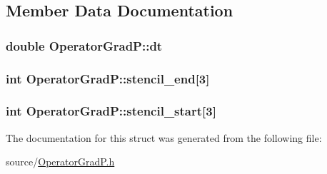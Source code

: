\subsection{Member Data Documentation}
\hypertarget{struct_operator_grad_p_a86a7e584cdd5928d1bc34fecd276783e}{}
\subsubsection[{dt}]{\setlength{\rightskip}{0pt plus 5cm}double Operator\+Grad\+P\+::dt}\label{struct_operator_grad_p_a86a7e584cdd5928d1bc34fecd276783e}
\hypertarget{struct_operator_grad_p_a62999b18820358c568c86636716379f7}{}
\subsubsection[{stencil\+\_\+end}]{\setlength{\rightskip}{0pt plus 5cm}int Operator\+Grad\+P\+::stencil\+\_\+end\mbox{[}3\mbox{]}}\label{struct_operator_grad_p_a62999b18820358c568c86636716379f7}
\hypertarget{struct_operator_grad_p_ab5d816eb1f3e6fea8946e0a31869e51f}{}
\subsubsection[{stencil\+\_\+start}]{\setlength{\rightskip}{0pt plus 5cm}int Operator\+Grad\+P\+::stencil\+\_\+start\mbox{[}3\mbox{]}}\label{struct_operator_grad_p_ab5d816eb1f3e6fea8946e0a31869e51f}


The documentation for this struct was generated from the following file\+:\begin{DoxyCompactItemize}
\item 
source/\hyperlink{_operator_grad_p_8h}{Operator\+Grad\+P.\+h}\end{DoxyCompactItemize}
